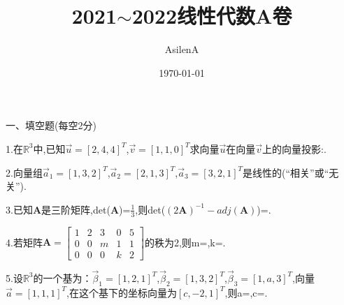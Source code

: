 \documentclass[a4paper]{article} %
\title{2021$\sim$2022线性代数A卷}
\author{AsilenA}
\date{\today}
\begin{document}
\maketitle
一、填空题(每空2分)

1.在\(\mathbb{R}^3\)中,已知\(\vec{u}=[2,4,4]^T\),\(\vec{v}=[1,1,0]^T\)求向量\(\vec{u}\)在向量\(\vec{v}\)上的向量投影:\underline{\hspace{2cm}}.

2.向量组\(\vec{a}_1=[1,3,2]^T\),\(\vec{a}_2=[2,1,3]^T\),\(\vec{a}_3=[3,2,1]^T\)是线性\underline{\hspace{1cm}}的(“相关”或“无关”).

3.已知\(\mathbf{A}\)是三阶矩阵,det(\(\mathbf{A}\))=\(\frac{1}{3}\),则det\big(\((2\mathbf{A})^{-1}-adj(\mathbf{A})\)\big)=\underline{\hspace{2cm}}.

4.若矩阵\(\mathbf{A}=\begin{bmatrix}1&2&3&0&5\\0&0&m&1&1\\0&0&0&k&2\end{bmatrix}\)的秩为2,则m=\underline{\hspace{2cm}},k=\underline{\hspace{2cm}}.

5.设\(\mathbb{R}^3\)的一个基为：\(\vec{\beta}_1=[1,2,1]^T\),\(\vec{\beta}_2=[1,3,2]^T\),\(\vec{\beta}_3=[1,a,3]^T\),向量\(\vec{a}=[1,1,1]^T\),在这个基下的坐标向量为\([c,-2,1]^T\),则a=\underline{\hspace{2cm}},c=\underline{\hspace{2cm}}.
\end{document}
